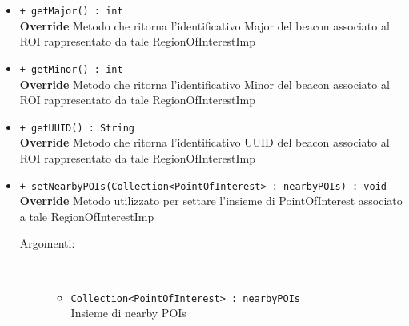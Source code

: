 \documentclass[../DefinizioneDiProdotto.tex]{subfiles}
\begin{document}
\begin{description}
\begin{itemize}
		\item \texttt{+ getMajor() : int}\\
		\textbf{Override} Metodo che ritorna l'identificativo Major del beacon associato al ROI rappresentato da tale RegionOfInterestImp
		\item \texttt{+ getMinor() : int}\\
		\textbf{Override} Metodo che ritorna l'identificativo Minor del beacon associato al ROI rappresentato da tale RegionOfInterestImp
		\item \texttt{+ getUUID() : String}\\
		\textbf{Override} Metodo che ritorna l'identificativo UUID del beacon associato al ROI rappresentato da tale RegionOfInterestImp
		\item \texttt{+ setNearbyPOIs(Collection<PointOfInterest> : nearbyPOIs) : void}\\
		\textbf{Override} Metodo utilizzato per settare l'insieme di PointOfInterest associato a tale RegionOfInterestImp
		\begin{description}
			\item[Argomenti:] \
			\begin{itemize}
				\item \texttt{Collection<PointOfInterest> : nearbyPOIs}\\
				Insieme di nearby POIs\end{itemize}
		\end{description}
	\end{itemize}
\end{description}
\end{document}
